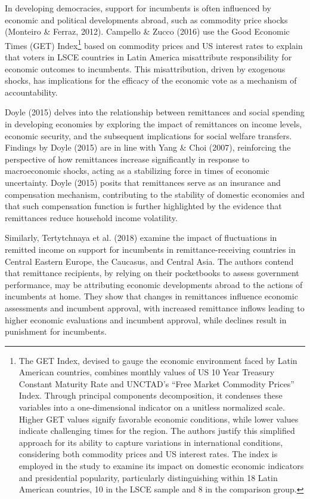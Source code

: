 \documentclass[
]{article}
\begin{document}
In developing democracies, support for incumbents is often influenced by
economic and political developments abroad, such as commodity price
shocks (Monteiro \& Ferraz, 2012). Campello \& Zucco (2016) use the Good
Economic Times (GET) Index\footnote{The GET Index, devised to gauge the
  economic environment faced by Latin American countries, combines
  monthly values of US 10 Year Treasury Constant Maturity Rate and
  UNCTAD's ``Free Market Commodity Prices'' Index. Through principal
  components decomposition, it condenses these variables into a
  one-dimensional indicator on a unitless normalized scale. Higher GET
  values signify favorable economic conditions, while lower values
  indicate challenging times for the region. The authors justify this
  simplified approach for its ability to capture variations in
  international conditions, considering both commodity prices and US
  interest rates. The index is employed in the study to examine its
  impact on domestic economic indicators and presidential popularity,
  particularly distinguishing within 18 Latin American countries, 10 in
  the LSCE sample and 8 in the comparison group.} based on commodity
prices and US interest rates to explain that voters in LSCE countries in
Latin America misattribute responsibility for economic outcomes to
incumbents. This misattribution, driven by exogenous shocks, has
implications for the efficacy of the economic vote as a mechanism of
accountability.

Doyle (2015) delves into the relationship between remittances and social
spending in developing economies by exploring the impact of remittances
on income levels, economic security, and the subsequent implications for
social welfare transfers. Findings by Doyle (2015) are in line with Yang
\& Choi (2007), reinforcing the perspective of how remittances increase
significantly in response to macroeconomic shocks, acting as a
stabilizing force in times of economic uncertainty. Doyle (2015) posits
that remittances serve as an insurance and compensation mechanism,
contributing to the stability of domestic economies and that such
compensation function is further highlighted by the evidence that
remittances reduce household income volatility.

Similarly, Tertytchnaya et al. (2018) examine the impact of fluctuations
in remitted income on support for incumbents in remittance-receiving
countries in Central Eastern Europe, the Caucasus, and Central Asia. The
authors contend that remittance recipients, by relying on their
pocketbooks to assess government performance, may be attributing
economic developments abroad to the actions of incumbents at home. They
show that changes in remittances influence economic assessments and
incumbent approval, with increased remittance inflows leading to higher
economic evaluations and incumbent approval, while declines result in
punishment for incumbents.
\end{document}
